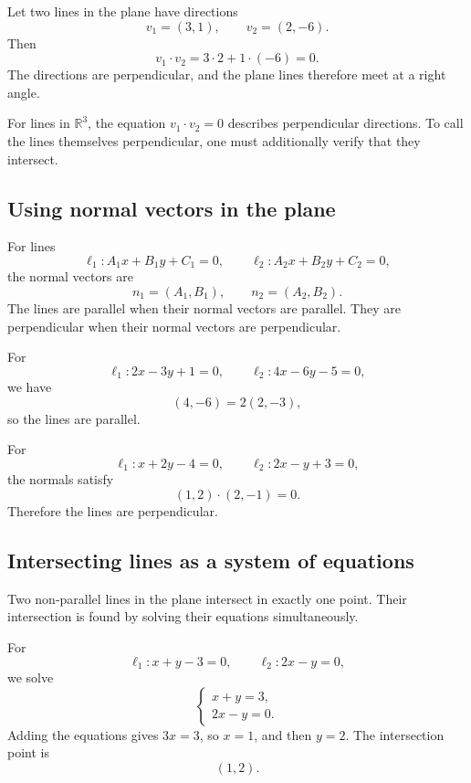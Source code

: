 \begin{examplebox}
Let two lines in the plane have directions
\[
v_1=(3,1),
\qquad
v_2=(2,-6).
\]
Then
\[
v_1\cdot v_2=3\cdot2+1\cdot(-6)=0.
\]
The directions are perpendicular, and the plane lines therefore meet at a right angle.
\end{examplebox}

\begin{remarkbox}
For lines in \(\mathbb{R}^3\), the equation \(v_1\cdot v_2=0\) describes perpendicular directions. To call the lines themselves perpendicular, one must additionally verify that they intersect.
\end{remarkbox}

\subsection*{Using normal vectors in the plane}

For lines
\[
\ell_1:A_1x+B_1y+C_1=0,
\qquad
\ell_2:A_2x+B_2y+C_2=0,
\]
the normal vectors are
\[
n_1=(A_1,B_1),
\qquad
n_2=(A_2,B_2).
\]
The lines are parallel when their normal vectors are parallel. They are perpendicular when their normal vectors are perpendicular.

\begin{examplebox}
For
\[
\ell_1:2x-3y+1=0,
\qquad
\ell_2:4x-6y-5=0,
\]
we have
\[
(4,-6)=2(2,-3),
\]
so the lines are parallel.
\end{examplebox}

\begin{examplebox}
For
\[
\ell_1:x+2y-4=0,
\qquad
\ell_2:2x-y+3=0,
\]
the normals satisfy
\[
(1,2)\cdot(2,-1)=0.
\]
Therefore the lines are perpendicular.
\end{examplebox}

\subsection*{Intersecting lines as a system of equations}

Two non-parallel lines in the plane intersect in exactly one point. Their intersection is found by solving their equations simultaneously.

\begin{examplebox}
For
\[
\ell_1:x+y-3=0,
\qquad
\ell_2:2x-y=0,
\]
we solve
\[
\begin{cases}
x+y=3,\\
2x-y=0.
\end{cases}
\]
Adding the equations gives \(3x=3\), so \(x=1\), and then \(y=2\). The intersection point is
\[
(1,2).
\]
\end{examplebox}

